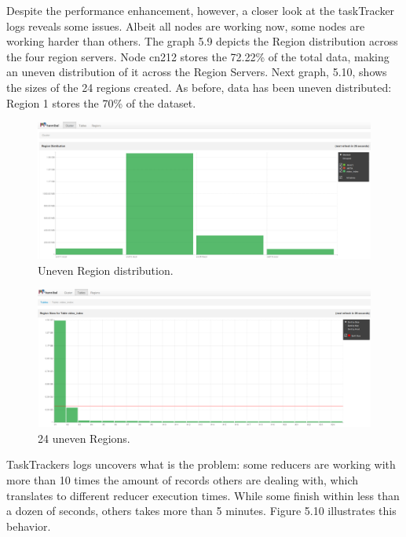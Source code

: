 Despite the performance enhancement, however, a closer look at the taskTracker logs reveals some issues. Albeit all nodes are working now, some nodes are working harder than others. The graph 5.9 depicts the Region distribution across the four region servers. Node cn212 stores the 72.22\% of the total data, making an uneven distribution of it across the Region Servers. Next graph, 5.10, shows the sizes of the 24 regions created. As before, data has been uneven distributed: Region 1 stores the 70\% of the dataset.




\begin{figure}[htb]
\centering
\includegraphics[width=1\textwidth]{./images/regiondistribution.png}
\caption{Uneven Region distribution.} \label{fig:regionDistribution}
\end{figure}



\begin{figure}[htb]
\centering
\includegraphics[width=1\textwidth]{./images/24regions.png}
\caption{24 uneven Regions.} \label{fig:oneRegion}
\end{figure}

TaskTrackers logs uncovers what is the problem: some reducers are working with more than 10 times the amount of records others are dealing with, which translates to different reducer execution times. While some finish within less than a dozen of seconds, others takes more than 5 minutes. Figure 5.10 illustrates this behavior.

